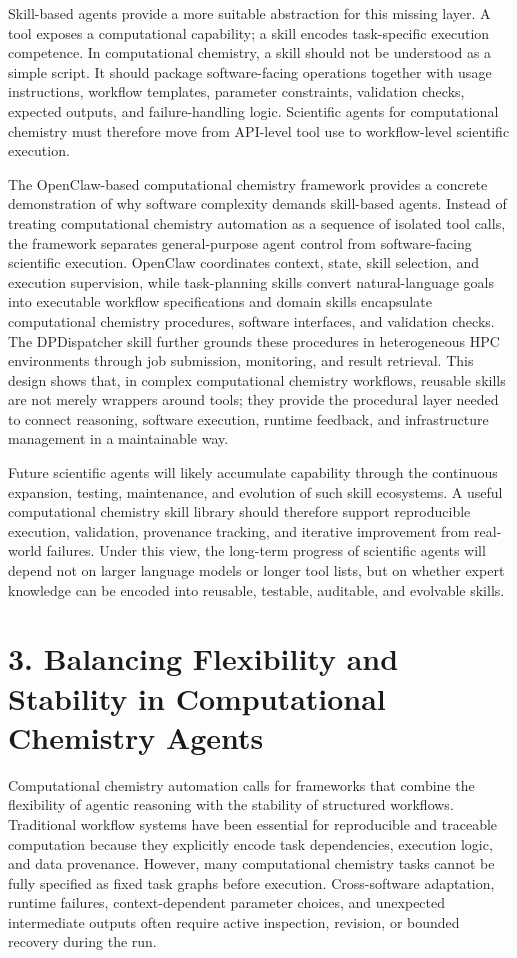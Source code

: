 \documentclass[journal=jacsat,manuscript=article]{achemso}
\begin{document}
Skill-based agents provide a more suitable abstraction for this missing layer. A tool exposes a computational capability; a skill encodes task-specific execution competence. In computational chemistry, a skill should not be understood as a simple script. It should package software-facing operations together with usage instructions, workflow templates, parameter constraints, validation checks, expected outputs, and failure-handling logic. Scientific agents for computational chemistry must therefore move from API-level tool use to workflow-level scientific execution.

The OpenClaw-based computational chemistry framework provides a concrete demonstration of why software complexity demands skill-based agents. Instead of treating computational chemistry automation as a sequence of isolated tool calls, the framework separates general-purpose agent control from software-facing scientific execution. OpenClaw coordinates context, state, skill selection, and execution supervision, while task-planning skills convert natural-language goals into executable workflow specifications and domain skills encapsulate computational chemistry procedures, software interfaces, and validation checks. The DPDispatcher skill further grounds these procedures in heterogeneous HPC environments through job submission, monitoring, and result retrieval. This design shows that, in complex computational chemistry workflows, reusable skills are not merely wrappers around tools; they provide the procedural layer needed to connect reasoning, software execution, runtime feedback, and infrastructure management in a maintainable way.

Future scientific agents will likely accumulate capability through the continuous expansion, testing, maintenance, and evolution of such skill ecosystems. A useful computational chemistry skill library should therefore support reproducible execution, validation, provenance tracking, and iterative improvement from real-world failures. Under this view, the long-term progress of scientific agents will depend not on larger language models or longer tool lists, but on whether expert knowledge can be encoded into reusable, testable, auditable, and evolvable skills.

\section{3. Balancing Flexibility and Stability in Computational Chemistry Agents}
Computational chemistry automation calls for frameworks that combine the flexibility of agentic reasoning with the stability of structured workflows. Traditional workflow systems have been essential for reproducible and traceable computation because they explicitly encode task dependencies, execution logic, and data provenance. However, many computational chemistry tasks cannot be fully specified as fixed task graphs before execution. Cross-software adaptation, runtime failures, context-dependent parameter choices, and unexpected intermediate outputs often require active inspection, revision, or bounded recovery during the run.
\end{document}
